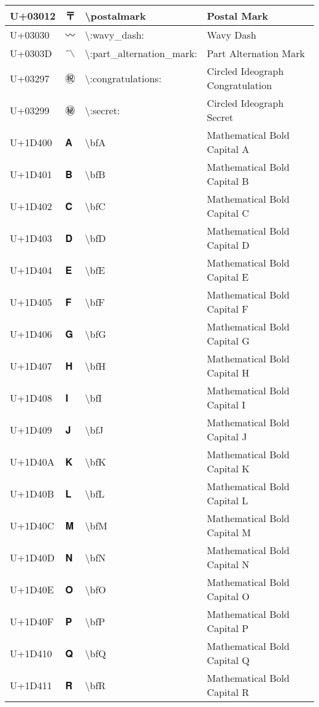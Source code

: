 \begin{table}[h]
\begin{tabulary}{\linewidth}{|L|L|L|L|}
\hline
U+03012 & 〒 & {\textbackslash}postalmark & Postal Mark \\
\hline
U+03030 & 〰 & {\textbackslash}:wavy\_dash: & Wavy Dash \\
\hline
U+0303D & 〽 & {\textbackslash}:part\_alternation\_mark: & Part Alternation Mark \\
\hline
U+03297 & ㊗ & {\textbackslash}:congratulations: & Circled Ideograph Congratulation \\
\hline
U+03299 & ㊙ & {\textbackslash}:secret: & Circled Ideograph Secret \\
\hline
U+1D400 & 𝐀 & {\textbackslash}bfA & Mathematical Bold Capital A \\
\hline
U+1D401 & 𝐁 & {\textbackslash}bfB & Mathematical Bold Capital B \\
\hline
U+1D402 & 𝐂 & {\textbackslash}bfC & Mathematical Bold Capital C \\
\hline
U+1D403 & 𝐃 & {\textbackslash}bfD & Mathematical Bold Capital D \\
\hline
U+1D404 & 𝐄 & {\textbackslash}bfE & Mathematical Bold Capital E \\
\hline
U+1D405 & 𝐅 & {\textbackslash}bfF & Mathematical Bold Capital F \\
\hline
U+1D406 & 𝐆 & {\textbackslash}bfG & Mathematical Bold Capital G \\
\hline
U+1D407 & 𝐇 & {\textbackslash}bfH & Mathematical Bold Capital H \\
\hline
U+1D408 & 𝐈 & {\textbackslash}bfI & Mathematical Bold Capital I \\
\hline
U+1D409 & 𝐉 & {\textbackslash}bfJ & Mathematical Bold Capital J \\
\hline
U+1D40A & 𝐊 & {\textbackslash}bfK & Mathematical Bold Capital K \\
\hline
U+1D40B & 𝐋 & {\textbackslash}bfL & Mathematical Bold Capital L \\
\hline
U+1D40C & 𝐌 & {\textbackslash}bfM & Mathematical Bold Capital M \\
\hline
U+1D40D & 𝐍 & {\textbackslash}bfN & Mathematical Bold Capital N \\
\hline
U+1D40E & 𝐎 & {\textbackslash}bfO & Mathematical Bold Capital O \\
\hline
U+1D40F & 𝐏 & {\textbackslash}bfP & Mathematical Bold Capital P \\
\hline
U+1D410 & 𝐐 & {\textbackslash}bfQ & Mathematical Bold Capital Q \\
\hline
U+1D411 & 𝐑 & {\textbackslash}bfR & Mathematical Bold Capital R \\

\end{tabulary}
\end{table}
